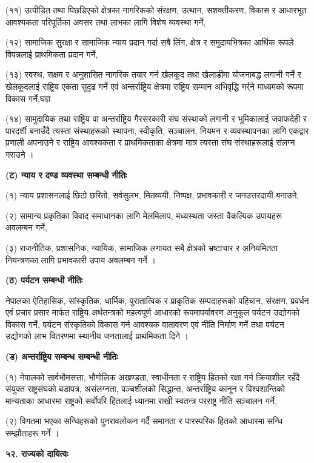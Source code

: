 (११) उत्पीडित तथा पिछडिएको क्षेत्रका नागरिकको संरक्षण, उत्थान, सशक्तीकरण, विकास र आधारभूत आवश्यकता परिपूर्तिका अवसर तथा लाभका लागि विशेष व्यवस्था गर्ने,

(१२) सामाजिक सुरक्षा र सामाजिक न्याय प्रदान गर्दा सबै लिंग, क्षेत्र र समुदायभित्रका आर्थिक रूपले विपन्नलाई प्राथमिकता प्रदान गर्ने,

(१३) स्वस्थ, सक्षम र अनुशासित नागरिक तयार गर्न खेलकूद तथा खेलाडीमा योजनाबद्ध लगानी गर्ने र खेलकूदलाई राष्ट्रिय एकता सुदृढ गर्ने एवं अन्तर्राष्ट्रिय क्षेत्रमा राष्ट्रिय सम्मान अभिवृद्धि गर्र्ने माध्यमको रूपमा विकास गर्ने,घज्ञ

(१४) सामुदायिक तथा राष्ट्रिय वा अन्तर्राष्ट्रिय गैरसरकारी संघ संस्थाको लगानी र भूमिकालाई जवाफदेही र पारदर्शी बनाउँदै त्यस्ता संस्थाहरूको स्थापना, स्वीकृति, सञ्चालन, नियमन र व्यवस्थापनका लागि एकद्वार प्रणाली अपनाउने र राष्ट्रिय आवश्यकता र प्राथमिकताका क्षेत्रमा मात्र त्यस्ता संघ संस्थाहरूलाई संलग्न गराउने ।

\textbf{(ट) न्याय र दण्ड व्यवस्था सम्बन्धी नीतिः}

(१) न्याय प्रशासनलाई छिटो छरितो, सर्वसुलभ, मितव्ययी, निष्पक्ष, प्रभावकारी र जनउत्तरदायी बनाउने,

(२) सामान्य प्रकृतिका विवाद समाधानका लागि मेलमिलाप, मध्यस्थता जस्ता वैकल्पिक उपायहरू अवलम्बन गर्ने,

(३) राजनीतिक, प्रशासनिक, न्यायिक, सामाजिक लगायत सबै क्षेत्रको भ्रष्टाचार र अनियमितता नियन्त्रणका लागि प्रभावकारी उपाय अवलम्बन गर्ने ।

\textbf{(ठ) पर्यटन सम्बन्धी नीतिः}

नेपालका ऐतिहासिक, सांस्कृतिक, धार्मिक, पुरातात्विक र प्राकृतिक सम्पदाहरूको पहिचान, संरक्षण, प्रवर्धन एवं प्रचार प्रसार मार्फत राष्ट्रिय अर्थतन्त्रको महत्वपूर्ण आधारको रूपमापर्यावरण अनुकूल पर्यटन उद्योगको विकास गर्ने, पर्यटन संस्कृतिको विकास गर्न आवश्यक वातावरण एवं नीति निर्माण गर्ने तथा पर्यटन उद्योगको लाभ वितरणमा स्थानीय जनतालाई प्राथमिकता दिने ।

\textbf{(ड) अन्तर्राष्ट्रिय सम्बन्ध सम्बन्धी नीतिः}

(१) नेपालको सार्वभौमसत्ता, भौगोलिक अखण्डता, स्वाधीनता र राष्ट्रिय हितको रक्षा गर्न क्रियाशील रहँदै संयुक्त राष्ट्रसंघको बडापत्र, असंलग्नता, पञ्चशीलको सिद्धान्त, अन्तर्राष्ट्रिय कानून र विश्वशान्तिको मान्यताका आधारमा राष्ट्रको सर्वोपरि हितलाई ध्यानमा राखी स्वतन्त्र परराष्ट्र नीति सञ्चालन गर्ने,

(२) विगतमा भएका सन्धिहरूको पुनरावलोकन गर्दै समानता र पारस्परिक हितको आधारमा सन्धि सम्झौताहरू गर्ने ।

\textbf{५२. राज्यको दायित्वः}

